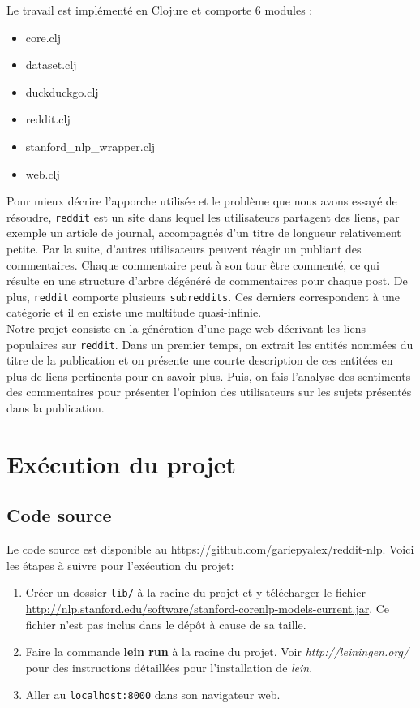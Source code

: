 \documentclass[12pt]{article}
\begin{document}
Le travail est implémenté en Clojure et comporte 6 modules :
\begin{itemize}
\item core.clj
\item dataset.clj
\item duckduckgo.clj
\item reddit.clj
\item stanford\_nlp\_wrapper.clj
\item web.clj
\end{itemize}

Pour mieux décrire l'apporche utilisée et le problème que nous avons essayé de résoudre, \verb;reddit; est un site dans lequel les utilisateurs partagent
des liens, par exemple un article de journal, accompagnés d'un titre de longueur relativement petite.
Par la suite, d'autres utilisateurs peuvent réagir un publiant des commentaires. Chaque commentaire peut à son tour être commenté,
ce qui résulte en une structure d'arbre dégénéré de commentaires pour chaque post.
De plus, \verb;reddit; comporte plusieurs \verb;subreddits;. Ces derniers correspondent à une catégorie et il en existe une multitude quasi-infinie.\\


Notre projet consiste en la génération d'une page web décrivant les liens populaires sur \verb;reddit;. Dans un premier temps, on extrait les entités nommées
du titre de la publication et on présente une courte description de ces entitées en plus de liens pertinents pour en savoir plus.
Puis, on fais l'analyse des sentiments des commentaires pour présenter l'opinion des utilisateurs sur les sujets présentés dans la publication.

\section{Exécution du projet}
\subsection{Code source}
Le code source est disponible au \url{https://github.com/gariepyalex/reddit-nlp}. Voici les étapes à suivre pour l'exécution du projet:
\begin{enumerate}
\item Créer un dossier \verb;lib/; à la racine du projet et y télécharger le fichier \url{http://nlp.stanford.edu/software/stanford-corenlp-models-current.jar}. Ce fichier n'est pas inclus dans le dépôt à cause de sa taille.
\item Faire la commande \textbf{lein run} à la racine du projet. Voir \emph{http://leiningen.org/} pour des instructions détaillées pour l'installation de \emph{lein}.
\item Aller au \verb;localhost:8000; dans son navigateur web.
\end{enumerate}
\end{document}
